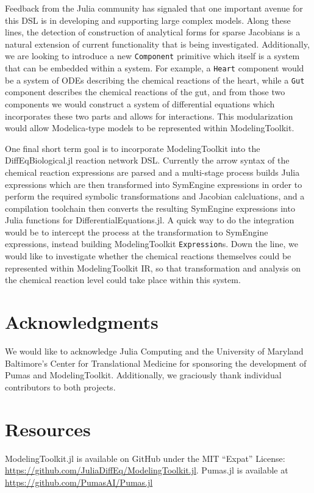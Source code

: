 \documentclass{juliacon}
\begin{document}
Feedback from the Julia community has signaled that one important avenue for this DSL is in developing and supporting large complex models. Along these lines, the detection of construction of analytical forms for sparse Jacobians is a natural extension of current functionality that is being investigated. Additionally, we are looking to introduce a new \texttt{Component} primitive which itself is a system that can be embedded within a system. For example, a \texttt{Heart} component would be a system of ODEs describing the chemical reactions of the heart, while a \texttt{Gut} component describes the chemical reactions of the gut, and from those two components we would construct a system of differential equations which incorporates these two parts and allows for interactions. This modularization would allow Modelica-type models to be represented within ModelingToolkit.

One final short term goal is to incorporate ModelingToolkit into the DiffEqBiological.jl reaction network DSL. Currently the arrow syntax of the chemical reaction expressions are parsed and a multi-stage process builds Julia expressions which are then transformed into SymEngine \cite{symengine} expressions in order to perform the required symbolic transformations and Jacobian calcluations, and a compilation toolchain then converts the resulting SymEngine expressions into Julia functions for DifferentialEquations.jl. A quick way to do the integration would be to intercept the process at the transformation to SymEngine expressions, instead building ModelingToolkit \texttt{Expression}s. Down the line, we would like to investigate whether the chemical reactions themselves could be represented within ModelingToolkit IR, so that transformation and analysis on the chemical reaction level could take place within this system.

\section{Acknowledgments}

We would like to acknowledge Julia Computing and the University of Maryland Baltimore's Center for Translational Medicine for sponsoring the development of Pumas and ModelingToolkit. Additionally, we graciously thank individual contributors to both projects.

\section{Resources}

ModelingToolkit.jl is available on GitHub under the MIT ``Expat'' License: \url{https://github.com/JuliaDiffEq/ModelingToolkit.jl}. Pumas.jl is available
at \url{https://github.com/PumasAI/Pumas.jl}


\end{document}
